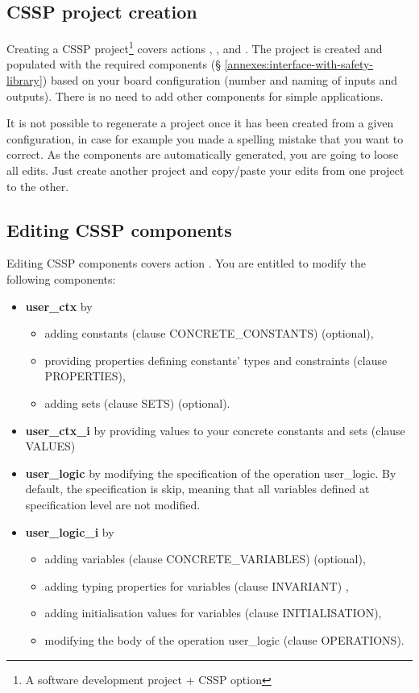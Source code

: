 \subsection{CSSP project creation}

Creating a CSSP project\footnote{A software development project + CSSP option} covers actions , , and . The project is created and populated with the required components (§ \ref{annexes:interface-with-safety-library}) based on your board configuration (number and naming of inputs and outputs). There is no need to add other components for simple applications. 
\begin{remark}
It is not possible to regenerate a project once it has been created from a given configuration, in case for example you made a spelling mistake that you want to correct. As the components are automatically generated, you are going to loose all edits. Just create another project and copy/paste your edits from one project to the other.
\end{remark}

\subsection{Editing CSSP components}

Editing CSSP components covers action . You are entitled to modify the following components:
\begin{itemize}
    \item \textbf{user\_ctx} by 
    \begin{itemize}    
        \item adding constants (clause CONCRETE\_CONSTANTS) (optional),
        \item providing properties defining constants' types and constraints (clause PROPERTIES),
        \item adding sets (clause SETS) (optional).
    \end{itemize}   
    \item \textbf{user\_ctx\_i} by providing values to your concrete constants and sets (clause VALUES)
    \item \textbf{user\_logic} by modifying the specification of the operation user\_logic. By default, the specification is skip, meaning that all variables defined at specification level are not modified. 
    \item \textbf{user\_logic\_i} by 
    \begin{itemize}    
        \item adding variables (clause CONCRETE\_VARIABLES) (optional),
        \item adding typing properties for variables (clause INVARIANT) ,
        \item adding initialisation values for variables (clause INITIALISATION),
        \item modifying the body of the operation user\_logic (clause OPERATIONS).
    \end{itemize}   
\end{itemize}


